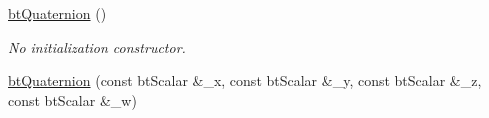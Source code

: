 \begin{DoxyCompactItemize}
\item 
\hypertarget{classbt_quaternion_a3b5e50d610ee8cdda2aa78e092825675}{\hyperlink{classbt_quaternion_a3b5e50d610ee8cdda2aa78e092825675}{bt\+Quaternion} ()}\label{classbt_quaternion_a3b5e50d610ee8cdda2aa78e092825675}

\begin{DoxyCompactList}\small\item\em No initialization constructor. \end{DoxyCompactList}\item 
\hypertarget{classbt_quaternion_a6a50bf861ae5fa4ad5ea2b7da231847c}{\hyperlink{classbt_quaternion_a6a50bf861ae5fa4ad5ea2b7da231847c}{bt\+Quaternion} (const bt\+Scalar \&\+\_\+x, const bt\+Scalar \&\+\_\+y, const bt\+Scalar \&\+\_\+z, const bt\+Scalar \&\+\_\+w)}\label{classbt_quaternion_a6a50bf861ae5fa4ad5ea2b7da231847c}


\end{DoxyCompactItemize}
